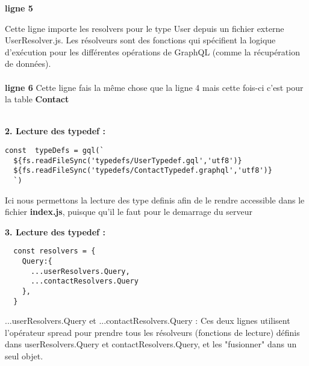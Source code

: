 \documentclass{article}
\begin{document}
\begin{tcolorbox}
\textbf{ligne 5}

Cette ligne importe les resolvers pour le type User depuis un fichier externe UserResolver.js. Les résolveurs sont des fonctions qui spécifient la logique d'exécution pour les différentes opérations de GraphQL (comme la récupération de données).\\\\
\textbf{ligne 6}
Cette ligne fais la même chose que la ligne 4 mais cette fois-ci c'est pour la table \textbf{Contact}\\\\

\end{tcolorbox}
\begin{tcolorbox}[
    title={\faCode\ Explication du contenu de \textbf{index.js} },
    colback=blue!5!white,
    colframe=blue!75!black,
    width=\dimexpr\textwidth+3cm\relax, %
    enlarge left by=-1.5cm,            %
    enlarge right by=-1.5cm,           %
    height fixed for=all,              %
    enlarge top initially by=5mm,      %
    enlarge bottom finally by=5mm,     %
    breakable,
    enhanced jigsaw,
    beforeafter skip=15pt,             %
    boxsep=10pt,                       %
    left=15pt,                         %
    right=15pt                         %
]

\textbf{2. Lecture des typedef :}
\begin{lstlisting}
const  typeDefs = gql(`
  ${fs.readFileSync('typedefs/UserTypedef.gql','utf8')}
  ${fs.readFileSync('typedefs/ContactTypedef.graphql','utf8')}
  `)  
\end{lstlisting}

Ici nous permettons la lecture des type definis  afin de le rendre accessible dans le fichier \textbf{index.js}, puisque qu'il le faut pour le demarrage du serveur 



\textbf{3. Lecture des typedef :}
\begin{lstlisting}
  const resolvers = {
    Query:{
      ...userResolvers.Query,
      ...contactResolvers.Query
    },
  }
\end{lstlisting}
...userResolvers.Query et ...contactResolvers.Query : Ces deux lignes utilisent l'opérateur spread pour prendre tous les résolveurs (fonctions de lecture) définis dans userResolvers.Query et contactResolvers.Query, et les "fusionner" dans un seul objet.


\end{tcolorbox}
\end{document}
